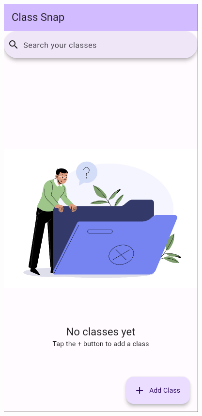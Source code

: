 \documentclass{beamer}
\begin{document}
\begin{frame}
\begin{figure}
\begin{minipage}{0.16\textwidth}
				\includegraphics[width=\linewidth]{list_empty_fixed}
			\end{minipage}
			\hspace*{0.5cm} 

\end{figure}
\end{frame}
\end{document}
